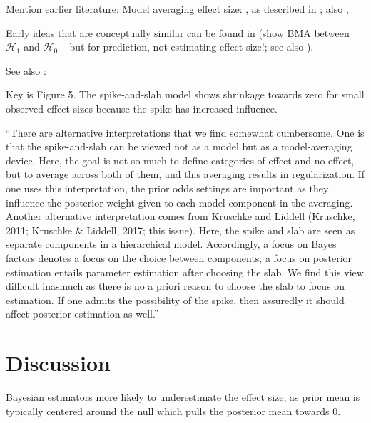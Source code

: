 \documentclass[a4paper]{article}
\begin{document}
Mention earlier literature:
Model averaging effect size:
\cite[pp. 640-641]{ZellnerVandaele1975}, as described in \cite[p. 600-601]{ZellnerSiow1980}; also \cite[p. 57]{Haldane1932}, \cite{IversonEtAl2010}

Early ideas that are conceptually similar can be found in \cite[p. 387]{WrinchJeffreys1921} (show BMA between $\mathcal{H}_1$ and $\mathcal{H}_0$ -- but for prediction, not estimating effect size!; see also \cite{Jevons18741913}).

See also \cite{RouderEtAl2018PBR}:

Key is Figure 5. The spike-and-slab model shows shrinkage towards zero for small observed effect sizes because the spike has increased influence.

``There are alternative interpretations that we find somewhat cumbersome. One is that the spike-and-slab can be viewed not as a model but as a model-averaging device. Here, the goal is not so much to define categories of effect and no-effect, but to average across both of them, and this averaging results in regularization. If one uses this interpretation, the prior odds settings are important as they influence the posterior weight given to each model component in the averaging. Another alternative interpretation comes from Kruschke and Liddell (Kruschke, 2011; Kruschke \& Liddell, 2017; this issue). Here, the spike and slab are seen as separate components in a hierarchical model. Accordingly, a focus on Bayes factors denotes a focus on the choice between components; a focus on posterior estimation entails parameter estimation after choosing the slab. We find this view difficult inasmuch as there is no a priori reason to choose the slab to focus on estimation. If one admits the possibility of the spike, then assuredly it should affect posterior estimation as well.''


\section*{Discussion}

Bayesian estimators more likely to underestimate the effect size, as prior mean is typically centered around the null which pulls the posterior mean towards 0.

\newpage
\clearpage



\end{document}
